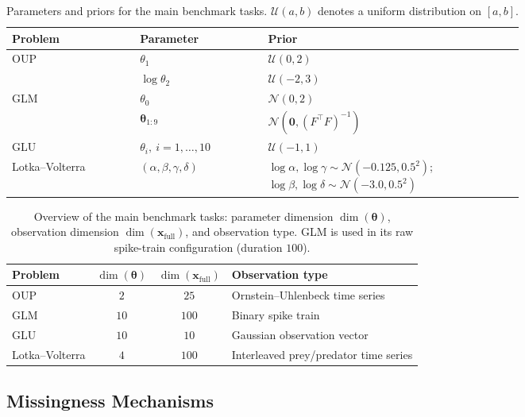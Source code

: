 \documentclass{article} %
\providecommand{\xfull}{\mathbf{x}_{\mathrm{full}}}
\providecommand{\thetab}{\boldsymbol{\theta}}
\begin{document}
\begin{table}[t]
\centering
\caption{Parameters and priors for the main benchmark tasks.
$\mathcal{U}(a,b)$ denotes a uniform distribution on $[a,b]$.}
\label{tab:priors}
\begin{tabular}{@{}lp{0.25\linewidth}p{0.50\linewidth}@{}}
\toprule
Problem & Parameter & Prior \\
\midrule
\multirow{2}{*}{OUP}
  & $\theta_1$       & $\mathcal{U}(0, 2)$ \\
  & $\log \theta_2$  & $\mathcal{U}(-2, 3)$ \\
\midrule
\multirow{2}{*}{GLM}
  & $\theta_0$ & $\mathcal{N}(0,2)$ \\
  & $\thetab_{1:9}$ & $\mathcal{N}(\mathbf{0}, (F^\top F)^{-1})$ \\
\midrule
GLU & $\theta_i,\ i = 1, \dots, 10$ & $\mathcal{U}(-1, 1)$ \\
\midrule
Lotka--Volterra & $(\alpha,\beta,\gamma,\delta)$ &
$\log \alpha,\log \gamma \sim \mathcal{N}(-0.125,0.5^2)$;
$\log \beta,\log \delta \sim \mathcal{N}(-3.0,0.5^2)$ \\
\bottomrule
\end{tabular}
\end{table}

\begin{table}[t]
\centering
\caption{Overview of the main benchmark tasks: parameter dimension
$\dim(\thetab)$, observation dimension $\dim(\xfull)$, and observation type. GLM
is used in its raw spike-train configuration (duration $100$).}
\label{tab:tasks-overview}
\begin{tabular}{@{}lccl@{}}
\toprule
Problem & $\dim(\thetab)$ & $\dim(\xfull)$ & Observation type \\
\midrule
OUP    & $2$  & $25$  & Ornstein--Uhlenbeck time series \\
GLM    & $10$ & $100$ & Binary spike train \\
GLU    & $10$ & $10$  & Gaussian observation vector \\
Lotka--Volterra & $4$ & $100$ & Interleaved prey/predator time series \\
\bottomrule
\end{tabular}
\end{table}

\subsection{Missingness Mechanisms}
\label{sec:missingness}
\end{document}
